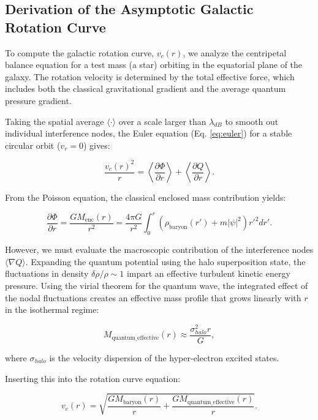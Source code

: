 \subsection{Derivation of the Asymptotic Galactic Rotation Curve}

To compute the galactic rotation curve, $v_c(r)$, we analyze the centripetal balance equation for a test mass (a star) orbiting in the equatorial plane of the galaxy. The rotation velocity is determined by the total effective force, which includes both the classical gravitational gradient and the average quantum pressure gradient. 

Taking the spatial average $\langle \cdot \rangle$ over a scale larger than $\lambda_{dB}$ to smooth out individual interference nodes, the Euler equation (Eq. \ref{eq:euler}) for a stable circular orbit ($v_r = 0$) gives:

\begin{equation}
\frac{v_c(r)^2}{r} = \left\langle \frac{\partial \Phi}{\partial r} \right\rangle + \left\langle \frac{\partial Q}{\partial r} \right\rangle.
\end{equation}

From the Poisson equation, the classical enclosed mass contribution yields:

\begin{equation}
\frac{\partial \Phi}{\partial r} = \frac{G M_{\text{enc}}(r)}{r^2} = \frac{4\pi G}{r^2} \int_0^r \left( \rho_{\text{baryon}}(r') + m|\psi|^2 \right) r'^2 dr'.
\end{equation}

However, we must evaluate the macroscopic contribution of the interference nodes $\langle \nabla Q \rangle$. Expanding the quantum potential using the halo superposition state, the fluctuations in density $\delta \rho / \rho \sim 1$ impart an effective turbulent kinetic energy pressure. Using the virial theorem for the quantum wave, the integrated effect of the nodal fluctuations creates an effective mass profile that grows linearly with $r$ in the isothermal regime:

\begin{equation}
M_{\text{quantum\_effective}}(r) \approx \frac{\sigma_{halo}^2 r}{G},
\end{equation}

where $\sigma_{halo}$ is the velocity dispersion of the hyper-electron excited states. 

Inserting this into the rotation curve equation:

\begin{equation}
v_c(r) = \sqrt{ \frac{G M_{\text{baryon}}(r)}{r} + \frac{G M_{\text{quantum\_effective}}(r)}{r} }.
\end{equation}

